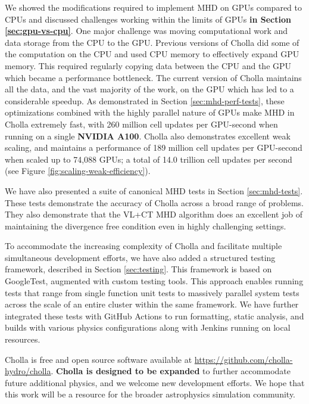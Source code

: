 \documentclass[modern, linenumbers]{aastex631}
\begin{document}
We showed the modifications required to implement MHD on GPUs compared to CPUs and discussed challenges working within the limits of GPUs \textbf{in Section \ref{sec:gpu-vs-cpu}}. One major challenge was moving computational work and data storage from the CPU to the GPU. Previous versions of Cholla did some of the computation on the CPU and used CPU memory to effectively expand GPU memory. This required regularly copying data between the CPU and the GPU which became a performance bottleneck. The current version of Cholla maintains all the data, and the vast majority of the work, on the GPU which has led to a considerable speedup. As demonstrated in Section \ref{sec:mhd-perf-tests}, these optimizations combined with the highly parallel nature of GPUs make MHD in Cholla extremely fast, with 260 million cell updates per GPU-second when running on a single \textbf{NVIDIA A100}. Cholla also demonstrates excellent weak scaling, and maintains a performance of 189 million cell updates per GPU-second when scaled up to 74,088 GPUs; a total of 14.0 trillion cell updates per second (see Figure \ref{fig:scaling-weak-efficiency}).

We have also presented a suite of canonical MHD tests in Section \ref{sec:mhd-tests}. These tests demonstrate the accuracy of Cholla across a broad range of problems. They also demonstrate that the VL+CT MHD algorithm does an excellent job of maintaining the divergence free condition even in highly challenging settings.

To accommodate the increasing complexity of Cholla and facilitate multiple simultaneous development efforts, we have also added a structured testing framework, described in Section \ref{sec:testing}. This framework is based on GoogleTest, augmented with custom testing tools. This approach enables running tests that range from single function unit tests to massively parallel system tests across the scale of an entire cluster within the same framework. We have further integrated these tests with GitHub Actions to run formatting, static analysis, and builds with various physics configurations along with Jenkins running on local resources.

Cholla is free and open source software available at \url{https://github.com/cholla-hydro/cholla}. \textbf{Cholla is designed to be expanded} to further accommodate future additional physics, and we welcome new development efforts. We hope that this work will be a resource for the broader astrophysics simulation community.
\end{document}
